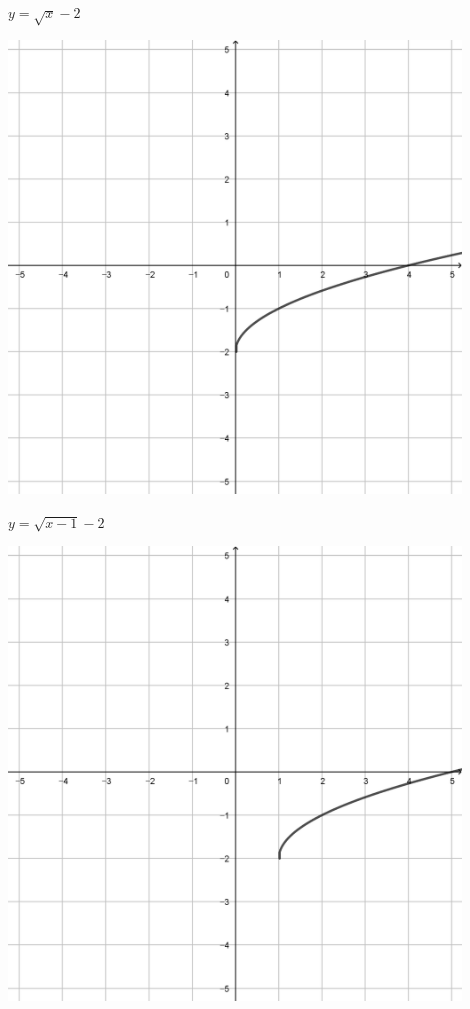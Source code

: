 \documentclass[a4paper]{oblivoir}
\begin{document}
\begin{minipage}{0.45\textwidth}\centering
\(y=\sqrt{x}-2\)
\par\bigskip\includegraphics[width=0.9\textwidth]{img/5_irrational_9}
\end{minipage}
\begin{minipage}{0.45\textwidth}\centering
\(y=\sqrt{x-1}-2\)
\par\bigskip\includegraphics[width=0.9\textwidth]{img/5_irrational_10}
\end{minipage}\bigskip\bigskip\par
\end{document}
